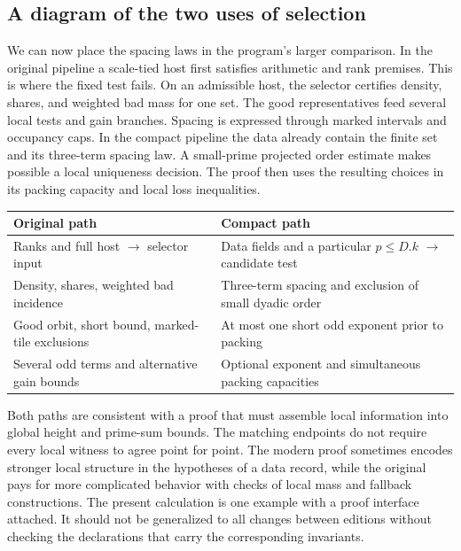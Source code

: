 \documentclass[12pt,letterpaper]{article}
\begin{document}
\subsection{A diagram of the two uses of selection}

We can now place the spacing laws in the program's larger comparison. In the original pipeline a scale-tied host first satisfies arithmetic and rank premises. This is where the fixed test fails. On an admissible host, the selector certifies density, shares, and weighted bad mass for one set. The good representatives feed several local tests and gain branches. Spacing is expressed through marked intervals and occupancy caps. In the compact pipeline the data already contain the finite set and its three-term spacing law. A small-prime projected order estimate makes possible a local uniqueness decision. The proof then uses the resulting choices in its packing capacity and local loss inequalities.

\begin{center}
\small
\begin{tabularx}{\linewidth}{@{}Y Y@{}}
\toprule
Original path & Compact path\\
\midrule
Ranks and full host \(\longrightarrow\) selector input
 & Data fields and a particular \(p\le D.k\) \(\longrightarrow\) candidate test\\
Density, shares, weighted bad incidence
 & Three-term spacing and exclusion of small dyadic order\\
Good orbit, short bound, marked-tile exclusions
 & At most one short odd exponent prior to packing\\
Several odd terms and alternative gain bounds
 & Optional exponent and simultaneous packing capacities\\
\bottomrule
\end{tabularx}
\end{center}

Both paths are consistent with a proof that must assemble local information into global height and prime-sum bounds. The matching endpoints do not require every local witness to agree point for point. The modern proof sometimes encodes stronger local structure in the hypotheses of a data record, while the original pays for more complicated behavior with checks of local mass and fallback constructions. The present calculation is one example with a proof interface attached. It should not be generalized to all changes between editions without checking the declarations that carry the corresponding invariants.
\end{document}
